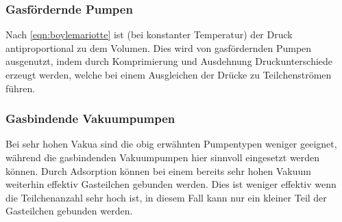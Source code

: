 \subsubsection*{Gasfördernde Pumpen}
Nach \ref{eqn:boylemariotte} ist (bei konstanter Temperatur) der Druck
antiproportional zu dem Volumen. Dies wird von gasfördernden Pumpen ausgenutzt,
indem durch Komprimierung und Ausdehnung Druckunterschiede erzeugt werden, welche
bei einem Ausgleichen der Drücke zu Teilchenströmen führen.

\subsubsection*{Gasbindende Vakuumpumpen}
Bei sehr hohen Vakua sind die obig erwähnten Pumpentypen weniger geeignet,
während die gasbindenden Vakuumpumpen hier sinnvoll eingesetzt werden können.
Durch Adsorption können bei einem bereits sehr hohen Vakuum weiterhin effektiv
Gasteilchen gebunden werden. Dies ist weniger effektiv wenn die Teilchenanzahl sehr hoch ist,
in diesem Fall kann nur ein kleiner Teil der Gasteilchen gebunden werden.

